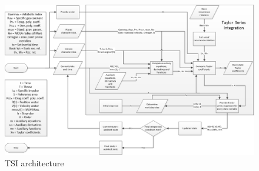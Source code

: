 \begin{figure}[!ht]
\centering
\includegraphics[width=1.5\textwidth, angle = 90]{figures/software/TSI_Propagator.png}
\caption{\ac{TSI} architecture}
\label{fig:TSI_Propagator}
\end{figure}


%

